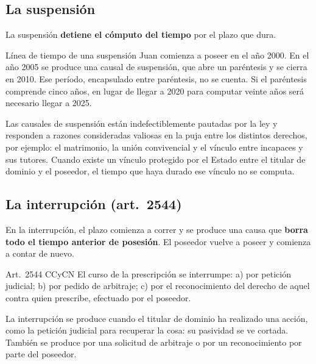 \documentclass[12pt,oneside]{book}
\begin{document}
\subsection{La suspensión}

La suspensión \textbf{detiene el cómputo del tiempo} por el plazo que dura.

\begin{ejemplo}{Línea de tiempo de una suspensión}
Juan comienza a poseer en el año 2000. En el año 2005 se produce una causal de suspensión, que abre un paréntesis y se cierra en 2010. Ese período, encapsulado entre paréntesis, no se cuenta. Si el paréntesis comprende cinco años, en lugar de llegar a 2020 para computar veinte años será necesario llegar a 2025.
\end{ejemplo}

Las causales de suspensión están indefectiblemente pautadas por la ley y responden a razones consideradas valiosas en la puja entre los distintos derechos, por ejemplo: el matrimonio, la unión convivencial y el vínculo entre incapaces y sus tutores. Cuando existe un vínculo protegido por el Estado entre el titular de dominio y el poseedor, el tiempo que haya durado ese vínculo no se computa.

\subsection{La interrupción (art.~2544)}

En la interrupción, el plazo comienza a correr y se produce una causa que \textbf{borra todo el tiempo anterior de posesión}. El poseedor vuelve a poseer y comienza a contar de nuevo.

\begin{regla}{Art.~2544 CCyCN}
El curso de la prescripción se interrumpe: a) por petición judicial; b) por pedido de arbitraje; c) por el reconocimiento del derecho de aquel contra quien prescribe, efectuado por el poseedor.
\end{regla}

La interrupción se produce cuando el titular de dominio ha realizado una acción, como la petición judicial para recuperar la cosa: su pasividad se ve cortada. También se produce por una solicitud de arbitraje o por un reconocimiento por parte del poseedor.
\end{document}
